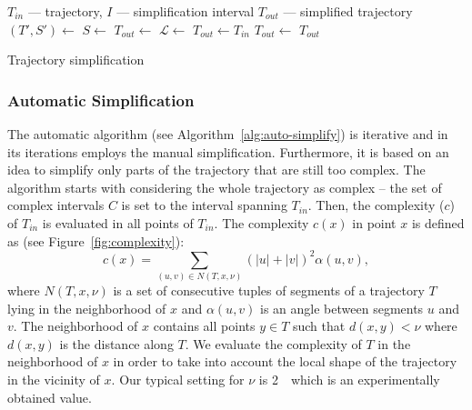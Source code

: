 \begin{algorithm}
  \begin{algorithmic}[1]
	  \Require $T_{in}$ --- trajectory, $I$ --- simplification interval
	  \Ensure $T_{out}$ --- simplified trajectory
			\State $(T', S') \gets$  
			\State $S \gets$ 
			\State
				\State $T_{out} \gets$ 
			\Else %
			  \State $\mathcal{L} \gets$  
				\State $T_{out} \gets T_{in}$
				 
					  \State $T_{out} \gets$ 
					\EndFor
				\EndFor
			\EndIf
			\State
			\State {}
			\State \Return $T_{out}$
		\EndProcedure
  \end{algorithmic}
	\caption{Trajectory simplification}
  \label{alg:simplify}
\end{algorithm}

\subsubsection*{Automatic Simplification}

The automatic algorithm (see Algorithm~\ref{alg:auto-simplify}) is iterative and in its iterations employs the manual simplification.
Furthermore, it is based on an idea to simplify only parts of the trajectory that are still too complex.
The algorithm starts with considering the whole trajectory as complex -- the set of complex intervals $C$ is set to the interval spanning $T_{in}$.
Then, the complexity ($c$) of $T_{in}$ is evaluated in all points of $T_{in}$.
The complexity $c(x)$ in point $x$ is defined as (see Figure~\ref{fig:complexity}):
\begin{equation}
  c(x) = \sum_{(u, v) \in N(T, x, \nu)}{(|u| + |v|)^2 \alpha(u, v)}, %
\label{eq:complexity}
\end{equation}
where $N(T, x, \nu)$ is a set of consecutive tuples of segments of a trajectory $T$ lying in the neighborhood of $x$ and $\alpha(u, v)$ is an angle between segments $u$ and $v$.
The neighborhood of $x$ contains all points $y \in T$ such that $d(x, y) < \nu$ where $d(x, y)$ is the distance along $T$.
We evaluate the complexity of $T$ in the neighborhood of $x$ in order to take into account the local shape of the trajectory in the vicinity of $x$.
Our typical setting for $\nu$ is 2~\angstrom\ which is an experimentally obtained value.

